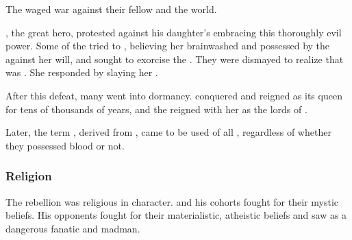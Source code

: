 The \firstgendragons{} waged war against their fellow \ophidians{}\prikker and the world.

\HesodNerga{}, the great \ophidian{} hero, protested against his daughter's embracing this thoroughly evil power. 
Some of the \ophidians{} tried to  \Tiamat, believing her brainwashed and possessed by the \xzaishanns{} against her will, and sought to exorcise the \daemons. 
They were dismayed to realize that \Tiamat{} was . 
She responded by slaying her \HesodNerga. 

After this defeat, many \ophidians{} went into dormancy. 
\Tiamat{} conquered \Miith{} and reigned as its queen for tens of thousands of years, and the \dragons{} reigned with her as the lords of \Miith{}. 

Later, the term \quo\dragon, derived from \quo\draecchonosh, came to be used of all \ophidians, regardless of whether they possessed \xzaishannic{} blood or not. 







\subsubsection{Religion}
The rebellion was religious in character. 
\Sethicus and his cohorts fought for their mystic beliefs.
His opponents fought for their materialistic, atheistic beliefs and saw \Sethicus as a dangerous fanatic and madman. 

